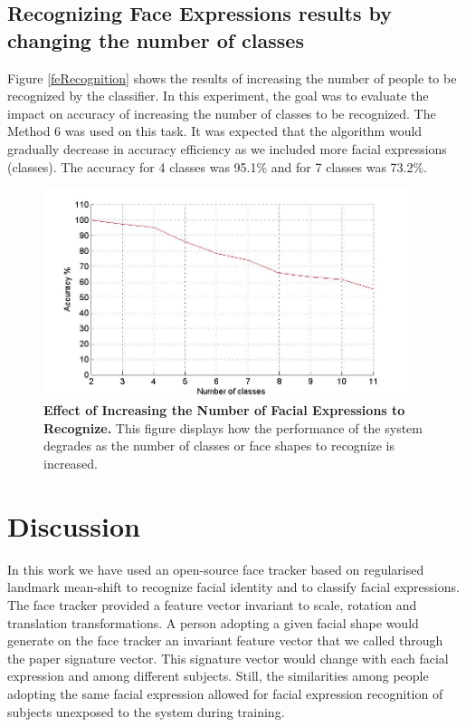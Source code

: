 \documentclass[]{article}
\begin{document}
 
\subsection{Recognizing Face Expressions results by changing the number of
classes}

Figure \ref{feRecognition} shows the results of increasing the number of people to be recognized by the classifier. In
this experiment, the goal was to evaluate the impact on accuracy of increasing  the number of classes to be recognized.
The Method 6 was used on this task. It was expected that the algorithm would gradually decrease in accuracy efficiency
as we included more facial expressions (classes). The accuracy for 4 classes was 95.1\% and for 7 classes was 73.2\%.


\begin{figure}[ht]
\begin{center}
\vspace{-3mm}
\includegraphics[width=0.95\textwidth]{figures/50people_increasing_classes.jpg}
\end{center}
\caption{\textbf{Effect of Increasing the Number of Facial Expressions to Recognize.} This figure displays how the 
performance of the system degrades as the number of classes or face shapes to recognize is increased. }
\label{increasingNumberExpressions}
\end{figure}


\section{Discussion}
In this work we have used an open-source face tracker based on regularised landmark mean-shift to recognize facial
identity and to classify facial expressions. The face tracker provided a feature vector invariant to scale, rotation and
translation transformations. A person adopting a given facial shape would generate on the face tracker an invariant
feature vector that we called through the paper signature vector. This signature vector would change with each facial
expression  and among different subjects. Still, the similarities among people adopting the same facial expression 
allowed for facial expression recognition of subjects unexposed to the system during training.
\end{document}
